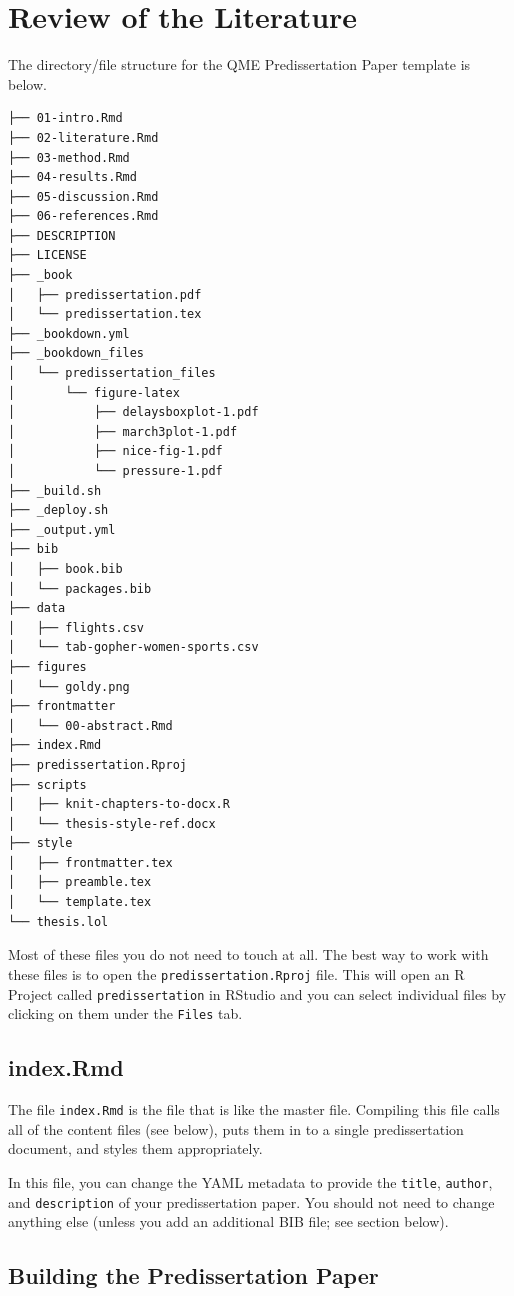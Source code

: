 \documentclass[12pt,letterpaper,oneside,oldfontcommands]{memoir}
\theoremstyle{definition}
\theoremstyle{definition}
\theoremstyle{definition}
\theoremstyle{remark}
\begin{document}
\hypertarget{review}{%
\chapter{Review of the Literature}\label{review}}

The directory/file structure for the QME Predissertation Paper template
is below.

\begin{verbatim}
├── 01-intro.Rmd
├── 02-literature.Rmd
├── 03-method.Rmd
├── 04-results.Rmd
├── 05-discussion.Rmd
├── 06-references.Rmd
├── DESCRIPTION
├── LICENSE
├── _book
│   ├── predissertation.pdf
│   └── predissertation.tex
├── _bookdown.yml
├── _bookdown_files
│   └── predissertation_files
│       └── figure-latex
│           ├── delaysboxplot-1.pdf
│           ├── march3plot-1.pdf
│           ├── nice-fig-1.pdf
│           └── pressure-1.pdf
├── _build.sh
├── _deploy.sh
├── _output.yml
├── bib
│   ├── book.bib
│   └── packages.bib
├── data
│   ├── flights.csv
│   └── tab-gopher-women-sports.csv
├── figures
│   └── goldy.png
├── frontmatter
│   └── 00-abstract.Rmd
├── index.Rmd
├── predissertation.Rproj
├── scripts
│   ├── knit-chapters-to-docx.R
│   └── thesis-style-ref.docx
├── style
│   ├── frontmatter.tex
│   ├── preamble.tex
│   └── template.tex
└── thesis.lol
\end{verbatim}

Most of these files you do not need to touch at all. The best way to
work with these files is to open the \texttt{predissertation.Rproj}
file. This will open an R Project called \texttt{predissertation} in
RStudio and you can select individual files by clicking on them under
the \texttt{Files} tab.

\hypertarget{index.rmd}{%
\section{index.Rmd}\label{index.rmd}}

The file \texttt{index.Rmd} is the file that is like the master file.
Compiling this file calls all of the content files (see below), puts
them in to a single predissertation document, and styles them
appropriately.

In this file, you can change the YAML metadata to provide the
\texttt{title}, \texttt{author}, and \texttt{description} of your
predissertation paper. You should not need to change anything else
(unless you add an additional BIB file; see section below).

\hypertarget{building-the-predissertation-paper}{%
\section{Building the Predissertation
Paper}\label{building-the-predissertation-paper}}
\end{document}
